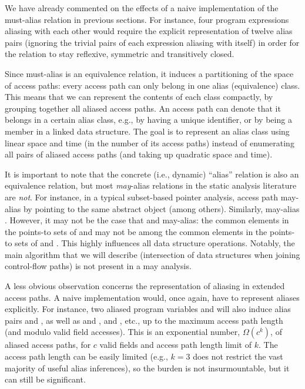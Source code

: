 We have already commented on the effects of a naive implementation of the must-alias relation in previous sections. For instance, four program expressions aliasing with each other would require the explicit representation of twelve alias pairs (ignoring the trivial pairs of each expression aliasing with itself) in order for the relation to stay reflexive, symmetric and transitively closed.

Since must-alias is an equivalence relation, it induces a partitioning of the space of access paths: every access path can only belong in one alias (equivalence) class. This means that we can represent the contents of each class compactly, by grouping together all aliased access paths. An access path can denote that it belongs in a certain alias class, e.g., by having a unique identifier, or by being a member in a linked data structure. The goal is to represent an alias class using linear space and time (in the number of its access paths) instead of enumerating all pairs of aliased access paths (and taking up quadratic space and time).

It is important to note that the concrete (i.e., dynamic) ``alias'' relation is also an equivalence relation, but most \emph{may}-alias relations in the static analysis literature are \emph{not}. For instance, in a typical subset-based pointer analysis, access path  may-alias  by pointing to the same abstract object (among others). Similarly,  may-alias . However, it may not be the case that  and  may-alias: the common elements in the points-to sets of  and  may not be among the common elements in the points-to sets of  and . This highly influences all data structure operations. Notably, the main algorithm that we will describe (intersection of data structures when joining control-flow paths) is not present in a may analysis.


A less obvious observation concerns the representation of aliasing in extended access paths. A naive implementation would, once again, have to represent aliases explicitly. For instance, two aliased program variables  and  will also induce alias pairs  and , as well as  and ,  and , etc., up to the maximum access path length (and modulo valid field accesses). This is an exponential number, $\Omega(c^k)$, of aliased access paths, for $c$ valid fields and access path length limit of $k$. The access path length can be easily limited (e.g., $k = 3$ does not restrict the vast majority of useful alias inferences), so the burden is not insurmountable, but it can still be significant.

